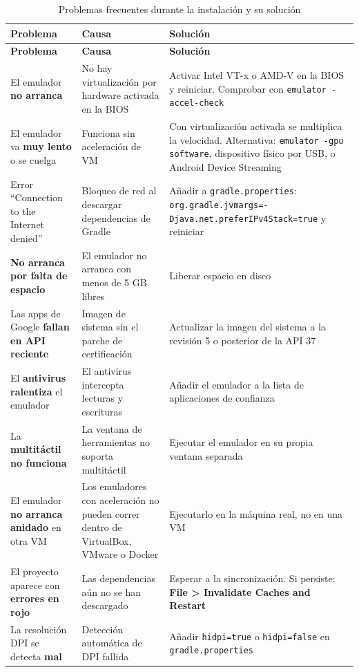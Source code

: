 \documentclass[11pt,a4paper]{article}
\newcommand{\code}[1]{\texttt{\color{ink}#1}}
\newcommand{\archivo}[1]{\texttt{\color{inkdim}#1}}
\begin{document}
	\begin{xltabular}{\textwidth}{@{}>{\RaggedRight\arraybackslash}p{3.3cm} >{\RaggedRight\arraybackslash}p{4.5cm} >{\RaggedRight\arraybackslash}X@{}}
		\caption{Problemas frecuentes durante la instalación y su solución}\label{tab:problemas}\\
		\toprule
		\textcolor{paper}{\sffamily\bfseries Problema} & \textcolor{paper}{\sffamily\bfseries Causa} & \textcolor{paper}{\sffamily\bfseries Solución} \\
		\midrule
		\endfirsthead
		\toprule
		\textcolor{paper}{\sffamily\bfseries Problema} & \textcolor{paper}{\sffamily\bfseries Causa} & \textcolor{paper}{\sffamily\bfseries Solución} \\
		\midrule
		\endhead
		\bottomrule
		\endlastfoot
		El emulador \textbf{no arranca} & No hay virtualización por hardware activada en la BIOS & Activar Intel VT-x o AMD-V en la BIOS y reiniciar. Comprobar con \code{emulator -accel-check} \\
		El emulador va \textbf{muy lento} o se cuelga & Funciona sin aceleración de VM & Con virtualización activada se multiplica la velocidad. Alternativa: \code{emulator -gpu software}, dispositivo físico por USB, o Android Device Streaming \\
		Error \enquote{Connection to the Internet denied} & Bloqueo de red al descargar dependencias de Gradle & Añadir a \archivo{gradle.properties}: \code{org.gradle.jvmargs=-Djava.net.preferIPv4Stack=true} y reiniciar \\
		\textbf{No arranca por falta de espacio} & El emulador no arranca con menos de 5 GB libres & Liberar espacio en disco \\
		Las apps de Google \textbf{fallan en API reciente} & Imagen de sistema sin el parche de certificación & Actualizar la imagen del sistema a la revisión 5 o posterior de la API 37 \\
		El \textbf{antivirus ralentiza} el emulador & El antivirus intercepta lecturas y escrituras & Añadir el emulador a la lista de aplicaciones de confianza \\
		La \textbf{multitáctil no funciona} & La ventana de herramientas no soporta multitáctil & Ejecutar el emulador en su propia ventana separada \\
		El emulador \textbf{no arranca anidado} en otra VM & Los emuladores con aceleración no pueden correr dentro de VirtualBox, VMware o Docker & Ejecutarlo en la máquina real, no en una VM \\
		El proyecto aparece con \textbf{errores en rojo} & Las dependencias aún no se han descargado & Esperar a la sincronización. Si persiste: \textbf{File > Invalidate Caches and Restart} \\
		La resolución DPI se detecta \textbf{mal} & Detección automática de DPI fallida & Añadir \code{hidpi=true} o \code{hidpi=false} en \archivo{gradle.properties} \\
	\end{xltabular}
	
\end{document}
